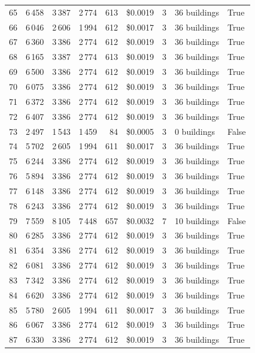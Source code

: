 \documentclass[a4paper,11pt]{article}
\begin{document}
\begin{table}[ht]
\begin{tabular}{r r r r r r r p{3cm} l}
65 & 6\,458 & 3\,387 & 2\,774 & 613 & \$0.0019 & 3 & 36 buildings & True \\
66 & 6\,046 & 2\,606 & 1\,994 & 612 & \$0.0017 & 3 & 36 buildings & True \\
67 & 6\,360 & 3\,386 & 2\,774 & 612 & \$0.0019 & 3 & 36 buildings & True \\
68 & 6\,165 & 3\,387 & 2\,774 & 613 & \$0.0019 & 3 & 36 buildings & True \\
69 & 6\,500 & 3\,386 & 2\,774 & 612 & \$0.0019 & 3 & 36 buildings & True \\
70 & 6\,075 & 3\,386 & 2\,774 & 612 & \$0.0019 & 3 & 36 buildings & True \\
71 & 6\,372 & 3\,386 & 2\,774 & 612 & \$0.0019 & 3 & 36 buildings & True \\
72 & 6\,407 & 3\,386 & 2\,774 & 612 & \$0.0019 & 3 & 36 buildings & True \\
73 & 2\,497 & 1\,543 & 1\,459 & 84 & \$0.0005 & 3 & 0 buildings & False \\
74 & 5\,702 & 2\,605 & 1\,994 & 611 & \$0.0017 & 3 & 36 buildings & True \\
75 & 6\,244 & 3\,386 & 2\,774 & 612 & \$0.0019 & 3 & 36 buildings & True \\
76 & 5\,894 & 3\,386 & 2\,774 & 612 & \$0.0019 & 3 & 36 buildings & True \\
77 & 6\,148 & 3\,386 & 2\,774 & 612 & \$0.0019 & 3 & 36 buildings & True \\
78 & 6\,243 & 3\,386 & 2\,774 & 612 & \$0.0019 & 3 & 36 buildings & True \\
79 & 7\,559 & 8\,105 & 7\,448 & 657 & \$0.0032 & 7 & 10 buildings & False \\
80 & 6\,285 & 3\,386 & 2\,774 & 612 & \$0.0019 & 3 & 36 buildings & True \\
81 & 6\,354 & 3\,386 & 2\,774 & 612 & \$0.0019 & 3 & 36 buildings & True \\
82 & 6\,081 & 3\,386 & 2\,774 & 612 & \$0.0019 & 3 & 36 buildings & True \\
83 & 7\,342 & 3\,386 & 2\,774 & 612 & \$0.0019 & 3 & 36 buildings & True \\
84 & 6\,620 & 3\,386 & 2\,774 & 612 & \$0.0019 & 3 & 36 buildings & True \\
85 & 5\,780 & 2\,605 & 1\,994 & 611 & \$0.0017 & 3 & 36 buildings & True \\
86 & 6\,067 & 3\,386 & 2\,774 & 612 & \$0.0019 & 3 & 36 buildings & True \\
87 & 6\,330 & 3\,386 & 2\,774 & 612 & \$0.0019 & 3 & 36 buildings & True \\

\end{tabular}
\end{table}
\end{document}
